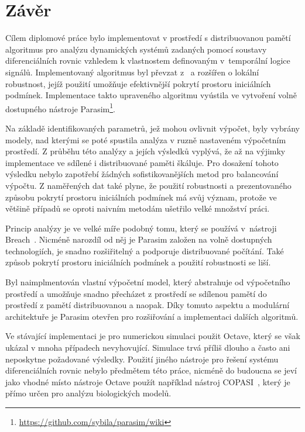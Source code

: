 \chapter{Závěr}\label{chapter:conclusion}

Cílem diplomové práce bylo implementovat v prostředí s distribuovanou pamětí
algoritmus pro analýzu dynamických systémů zadaných pomocí
soustavy diferenciálních rovnic vzhledem k vlastnostem definovaným
v~tem\-po\-rál\-ní logice signálů. Implementovaný algoritmus byl
převzat z~\cite{drazan2011} a rozšířen o lokální robustnost, jejíž použití umožňuje
efektivnější pokrytí prostoru iniciálních pod\-mí\-nek. 
Implementace takto upraveného algoritmu vyústila ve vytvoření volně dostupného nástroje Parasim\footnote{\url{https://github.com/sybila/parasim/wiki}}.

Na základě identifikovaných parametrů, jež mohou ovlivnit výpočet, byly vybrány modely,
nad kterými se poté spustila analýza v ruzně nastaveném výpočetním prostředí.
Z průběhu této analýzy a jejích výsledků vyplývá, že až na výjimky implementace
ve sdílené i distribuované paměti škáluje. Pro dosažení tohoto výsledku nebylo zapotřebí
žádných sofistikovanějších metod pro balancování výpočtu. Z naměřených
dat také plyne, že použití robustnosti a prezentovaného způsobu pokrytí prostoru iniciálních podmínek má svůj význam,
protože ve většině případů se oproti naivním metodám ušetřilo velké množství práci.

Princip analýzy je ve velké míře podobný tomu, který se používá v~nás\-tro\-ji Breach~\cite{donze2010breach}.
Nicméně narozdíl od něj je Parasim založen na volně dostupných technologiích, je snadno rozšiřitelný
a podporuje distribuované počítání. Také způsob pokrytí prostoru iniciálních podmínek
a použití robustnosti se liší.

Byl naimplmentován vlastní výpočetní model, který abstrahuje od vý\-po\-čet\-ního
prostředí a umožňuje snadno přecházet z prostředí se sdí\-le\-nou pamětí do prostředí z pamětí distribuovanou
a naopak. Díky tomuto a\-spek\-tu a modulární architektuře je Parasim otevřen pro rozšiřování a
implementaci dalších algoritmů.

Ve stávající implementaci je pro numerickou simulaci použit Octave, který se
však ukázal v mnoha případech nevyhovující. Simulace trvá příliš dlouho a často ani
neposkytne požadované výsledky. Použití jiného nástroje pro řešení systému
diferenciálních rovnic nebylo předmětem této práce, nicméně do budoucna se jeví jako vhodné
místo nástroje Octave použít například nástroj COPASI~\cite{hoops2006}, který je přímo určen
pro analýzu biologických modelů.
